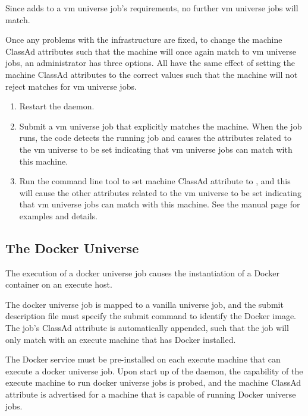 Since 
adds  to a vm universe job's requirements,
no further 
vm universe jobs will match.

Once any problems with the infrastructure are fixed,
to change the machine ClassAd attributes such that the machine
will once again match to vm universe jobs,
an administrator has three options.  
All have the same effect
of setting the machine ClassAd attributes to the correct values
such that the machine will not reject matches for vm universe jobs.
\begin{enumerate}
\item  Restart the  daemon.
\item  Submit a vm universe job that explicitly matches the machine.
When the job runs, the code detects the running job and causes 
the attributes related to the vm universe to be set indicating 
that vm universe jobs can match with this machine.
\item  Run the command line tool 
to set machine ClassAd attribute  to ,
and this will cause the other attributes related to the vm universe 
to be set indicating that vm universe jobs can match with this machine.
See the  manual page for
examples and details.
\end{enumerate}

\subsection{\label{sec:docker-install}The Docker Universe}
The execution of a docker universe job causes the
instantiation of a Docker container on an execute host.

The docker universe job is mapped to a vanilla universe job,
and the submit description file must specify 
the submit command  to identify the Docker image.
The job's  ClassAd attribute is automatically appended,
such that the job will only match with an execute machine 
that has Docker installed.

The Docker service must be pre-installed on each execute machine
that can execute a docker universe job.
Upon start up of the  daemon,
the capability of the execute machine to run docker universe jobs is probed, 
and the machine ClassAd attribute  is advertised
for a machine that is capable of running Docker universe jobs.

